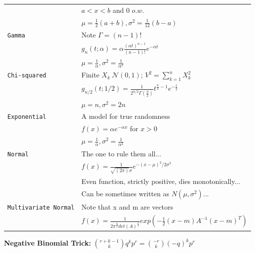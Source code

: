 \documentclass[10pt,landscape]{article}
\begin{document}
\begin{multicols*}{3}
\begin{tabular}{@{}ll@{}}
	\verb!! &$ a<x<b$ and $0$ $o.w.$\\
	\verb!! &$\mu=\frac{1}{2}(a+b), \sigma^2=\frac{1}{12}(b-a)$\\
	\verb!Gamma!& Note $\Gamma =(n-1)!$  \\
	\verb!! &$g_n(t;\alpha)=\alpha \frac{(\alpha t)^{n-1}} {(n-1)!}e^{-\alpha t}$\\
	\verb!! &$\mu=\frac{1}{\alpha}  , \sigma^2=\frac{1}{\alpha^2}$\\
	\verb!Chi-squared!  & Finite $X_k ~\mathcal{N}(0,1)$; $V^2=\sum_{k=1}^{n} X_k^2$ \\
	\verb!! & $g_{n/2}(t;1/2)=\frac{1}{2^{n/2}\Gamma(\frac{n}{2})}t^{\frac{n}{2} -1}e^{-\frac{t}{2}}$\\
	\verb!! &$\mu=n  , \sigma^2=2n$\\	
	\verb!Exponential!  & A model for true randomness \\
	\verb!! & $f(x)=\alpha e^{-\alpha x}$ for $x>0$\\
	\verb!! &$\mu=\frac{1}{\alpha}  , \sigma^2=\frac{1}{\alpha^2}$\\
	\verb!Normal! & The one to rule them all... \\
	\verb!! & $f(x) = \frac{1}{\sqrt{(2 \pi)} \sigma} e^{-(x-\mu)^{2}/2 \sigma^{2}}$ \\
	\verb!! & \hspace{-75pt} Even function, strictly positive, dies monotonically...\\
	\verb!! & \hspace{-75pt} Can be sometimes written as $N(\mu,\sigma^2)$...\\
	\verb!Multivariate Normal! & Note that x and m are vectors \\
	\verb!! & \hspace{-55pt}$f(x)=\frac{1}{2\pi^{\frac{n}{2}} det(A)^{\frac{1}{2}}}exp(-\frac{1}{2}(x-m)A^{-1}(x-m)^T)$
	
\end{tabular}

\textbf{Negative Binomial Trick:}
$ { r+k-1 \choose k}q^kp^r={-r \choose k}(-q)^kp^r$

\end{multicols*}
\end{document}
